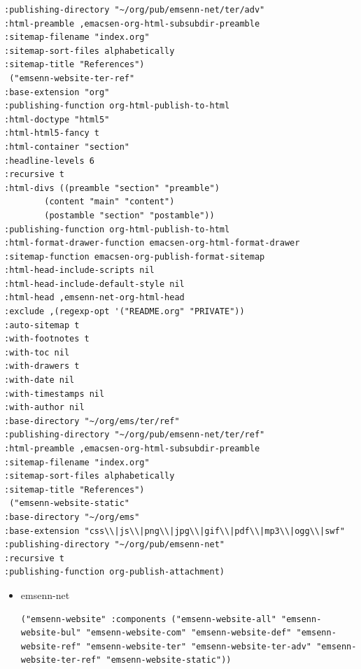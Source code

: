 \documentclass[11pt]{article}
\begin{document}
\begin{itemize}
\begin{itemize}
\begin{itemize}
\begin{verbatim}
:publishing-directory "~/org/pub/emsenn-net/ter/adv"
:html-preamble ,emacsen-org-html-subsubdir-preamble
:sitemap-filename "index.org"
:sitemap-sort-files alphabetically
:sitemap-title "References")
 ("emsenn-website-ter-ref"
:base-extension "org"
:publishing-function org-html-publish-to-html
:html-doctype "html5"
:html-html5-fancy t
:html-container "section"
:headline-levels 6
:recursive t
:html-divs ((preamble "section" "preamble")
	    (content "main" "content")
	    (postamble "section" "postamble"))
:publishing-function org-html-publish-to-html
:html-format-drawer-function emacsen-org-html-format-drawer
:sitemap-function emacsen-org-publish-format-sitemap
:html-head-include-scripts nil
:html-head-include-default-style nil
:html-head ,emsenn-net-org-html-head
:exclude ,(regexp-opt '("README.org" "PRIVATE"))
:auto-sitemap t
:with-footnotes t
:with-toc nil
:with-drawers t
:with-date nil
:with-timestamps nil
:with-author nil
:base-directory "~/org/ems/ter/ref"
:publishing-directory "~/org/pub/emsenn-net/ter/ref"
:html-preamble ,emacsen-org-html-subsubdir-preamble
:sitemap-filename "index.org"
:sitemap-sort-files alphabetically
:sitemap-title "References")
 ("emsenn-website-static"
:base-directory "~/org/ems"
:base-extension "css\\|js\\|png\\|jpg\\|gif\\|pdf\\|mp3\\|ogg\\|swf"
:publishing-directory "~/org/pub/emsenn-net"
:recursive t
:publishing-function org-publish-attachment)
\end{verbatim}
\begin{itemize}
\item emsenn-net
\label{sec:orgfe74fe9}
\begin{verbatim}
("emsenn-website" :components ("emsenn-website-all" "emsenn-website-bul" "emsenn-website-com" "emsenn-website-def" "emsenn-website-ref" "emsenn-website-ter" "emsenn-website-ter-adv" "emsenn-website-ter-ref" "emsenn-website-static"))


\end{verbatim}
\end{itemize}
\end{itemize}
\end{itemize}
\end{itemize}
\end{document}
